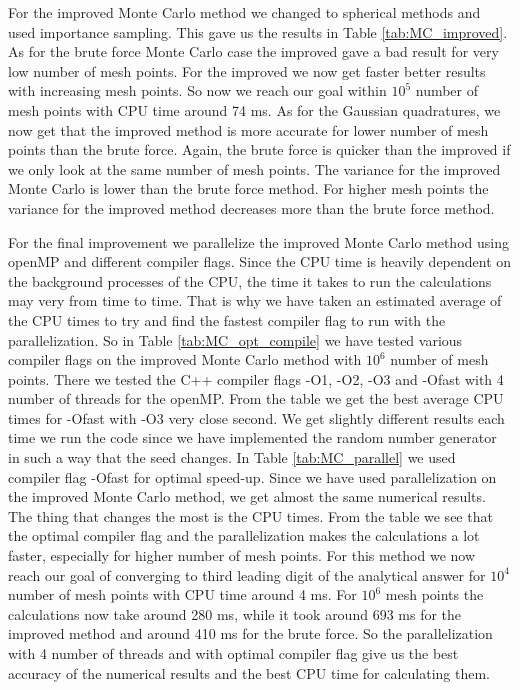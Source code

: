 \documentclass[12pt,a4paper,english]{article}
\begin{document}
For the improved Monte Carlo method we changed to spherical methods and used importance sampling. This gave us the results in Table \ref{tab:MC_improved}. As for the brute force Monte Carlo case the improved gave a bad result for very low number of mesh points. For the improved we now get faster better results with increasing mesh points. So now we reach our goal within $10^5$ number of mesh points with CPU time around 74 ms. As for the Gaussian quadratures, we now get that the improved method is more accurate for lower number of mesh points than the brute force. Again, the brute force is quicker than the improved if we only look at the same number of mesh points. The variance for the improved Monte Carlo is lower than the brute force method. For higher mesh points the variance for the improved method decreases more than the brute force method.

For the final improvement we parallelize the improved Monte Carlo method using openMP and different compiler flags. Since the CPU time is heavily dependent on the background processes of the CPU, the time it takes to run the calculations may very from time to time. That is why we have taken an estimated average of the CPU times to try and find the fastest compiler flag to run with the parallelization. So in Table \ref{tab:MC_opt_compile} we have tested various compiler flags on the improved Monte Carlo method with $10^6$ number of mesh points. There we tested the C++ compiler flags -O1, -O2, -O3 and -Ofast with 4 number of threads for the openMP. From the table we get the best average CPU times for -Ofast with -O3 very close second. We get slightly different results each time we run the code since we have implemented the random number generator in such a way that the seed changes. In Table \ref{tab:MC_parallel} we used compiler flag -Ofast for optimal speed-up. Since we have used parallelization on the improved Monte Carlo method, we get almost the same numerical results. The thing that changes the most is the CPU times. From the table we see that the optimal compiler flag and the parallelization makes the calculations a lot faster, especially for higher number of mesh points. For this method we now reach our goal of converging to third leading digit of the analytical answer for $10^4$ number of mesh points with CPU time around 4 ms. For $10^6$ mesh points the calculations now take around 280 ms, while it took around 693 ms for the improved method and around 410 ms for the brute force. So the parallelization with 4 number of threads and with optimal compiler flag give us the best accuracy of the numerical results and the best CPU time for calculating them.
\end{document}
